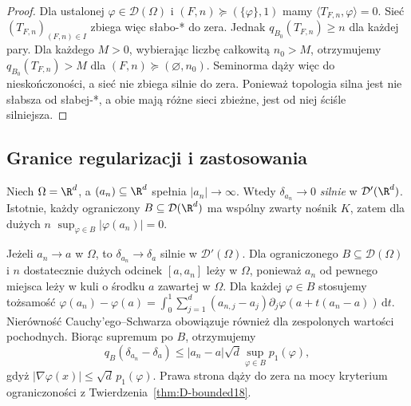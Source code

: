 \begin{proof}
Dla ustalonej $\varphi\in\mathcal D(\Omega)$ i
$(F,n)\succeq(\{\varphi\},1)$ mamy
$\langle T_{F,n},\varphi\rangle=0$. Sieć
$(T_{F,n})_{(F,n)\in I}$ zbiega więc słabo-* do zera.
Jednak $q_{B_0}(T_{F,n})\ge n$ dla każdej pary.
Dla każdego $M>0$, wybierając liczbę całkowitą $n_0>M$,
otrzymujemy $q_{B_0}(T_{F,n})>M$ dla
$(F,n)\succeq(\varnothing,n_0)$. Seminorma dąży więc
do nieskończoności, a sieć nie zbiega silnie do zera. Ponieważ topologia silna
jest nie słabsza od słabej-*, a obie mają różne sieci zbieżne,
jest od niej ściśle silniejsza.
\end{proof}

\subsection{Granice regularizacji i zastosowania}

\begin{przyklad}
\label{ex:delta-escape19}
Niech $\Omega=\R^d$, a $(a_n)\subseteq\R^d$
spełnia $|a_n|\to\infty$. Wtedy $\delta_{a_n}\to0$
\emph{silnie} w $\mathcal D'(\R^d)$.
Istotnie, każdy ograniczony $B\subseteq\mathcal D(\R^d)$
ma wspólny zwarty nośnik $K$, zatem dla dużych $n$
$\sup_{\varphi\in B}|\varphi(a_n)|=0$.
\end{przyklad}

\begin{przyklad}
\label{ex:delta-continuity19}
Jeżeli $a_n\to a$ w $\Omega$, to
$\delta_{a_n}\to\delta_a$ silnie w $\mathcal D'(\Omega)$.
Dla ograniczonego $B\subseteq\mathcal D(\Omega)$
i $n$ dostatecznie dużych odcinek $[a,a_n]$ leży
w $\Omega$, ponieważ $a_n$ od pewnego miejsca
leży w kuli o środku $a$ zawartej w $\Omega$.
Dla każdej $\varphi\in B$ stosujemy tożsamość
$\varphi(a_n)-\varphi(a)=\int_0^1
\sum_{j=1}^d(a_{n,j}-a_j)\partial_j\varphi(a+t(a_n-a))\,
\mathrm dt$.
Nierówność Cauchy'ego--Schwarza obowiązuje również
dla zespolonych wartości pochodnych. Biorąc supremum po $B$,
otrzymujemy
\[q_B(\delta_{a_n}-\delta_a)\le
|a_n-a|\sqrt d\sup_{\varphi\in B}p_1(\varphi),
\]
gdyż $|\nabla\varphi(x)|\le\sqrt d\,p_1(\varphi)$.
Prawa strona dąży do zera na mocy kryterium
ograniczoności z Twierdzenia~\ref{thm:D-bounded18}.
\end{przyklad}

